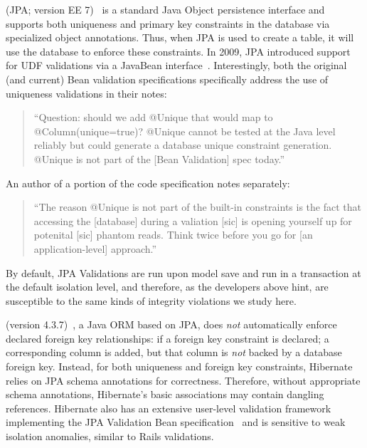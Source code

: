  (JPA; version EE 7)~\cite{code-jpa} is a
standard Java Object persistence interface and supports both
uniqueness and primary key constraints in the database via specialized
object annotations. Thus, when JPA is used to create a table, it will
use the database to enforce these constraints. In 2009, JPA introduced
support for UDF validations via a JavaBean
interface~\cite{code-bean-validation}. Interestingly, both the
original (and current) Bean validation specifications specifically
address the use of uniqueness validations in their notes:\vspace{-.25em}
\begin{quote}
``Question: should we add @Unique that would map to @Column(unique=true)?
@Unique cannot be tested at the Java level reliably but could generate
a database unique constraint generation. @Unique is not part
of the [Bean Validation] spec today.''~\cite{jsr-bean}\vspace{-.25em}
\end{quote}
An author of a portion of the code specification notes separately:\vspace{-.25em}
\begin{quote}
  ``The reason @Unique is not part of the built-in constraints is the
  fact that accessing the [database] during a valiation [sic] is
  opening yourself up for potenital [sic] phantom reads. Think twice
  before you go for [an application-level] approach.''~\cite{unique-bean}\vspace{-.25em}
\end{quote}
By default, JPA Validations are run upon model save and run in a
transaction at the default isolation level, and therefore, as the
developers above hint, are susceptible to the same kinds of integrity
violations we study here.

 (version 4.3.7)~\cite{code-hibernate}, a Java ORM
based on JPA, does \textit{not} automatically enforce declared foreign
key relationships: if a foreign key constraint is declared; a
corresponding column is added, but that column is \textit{not} backed by a
database foreign key. Instead, for both uniqueness and foreign key
constraints, Hibernate relies on JPA schema annotations for
correctness. Therefore, without appropriate schema annotations,
Hibernate's basic associations may contain dangling references. Hibernate also has an extensive user-level validation
framework implementing the JPA Validation Bean
specification~\cite{code-hibernate-validator} and is sensitive to weak
isolation anomalies, similar to Rails validations.

